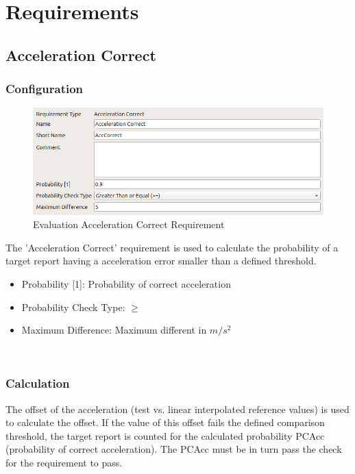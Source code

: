 \section{Requirements}
\label{sec:eval_requirements} 

\subsection{Acceleration Correct}
\label{sec:eval_req_accel_correct} 

\subsubsection{Configuration}

\begin{figure}[H]
    \includegraphics[width=14cm,frame]{figures/eval_req_acceleration.png}
  \caption{Evaluation Acceleration Correct Requirement}
\end{figure}

The ’Acceleration Correct’ requirement is used to calculate the probability of a target report having a acceleration error smaller than a defined threshold. 

\begin{itemize}  
\item Probability [1]: Probability of correct acceleration
\item Probability Check Type: $\geq$
\item Maximum Difference: Maximum different in $m/s^2$
\end{itemize}
\ \\

\subsubsection{Calculation}

The offset of the acceleration (test vs. linear interpolated reference values) is used to calculate the offset. If the value of this offset fails the defined comparison threshold, the target report is counted for the calculated probability PCAcc (probability of correct acceleration). The PCAcc must be in turn pass the check for the requirement to pass. 

